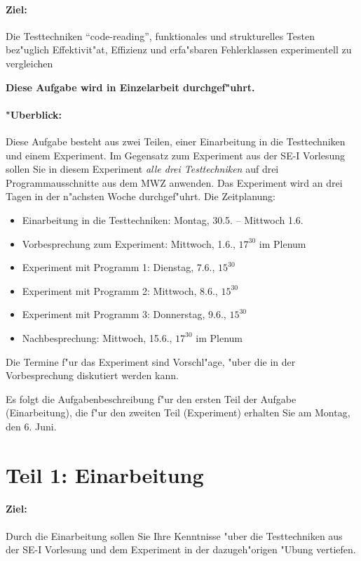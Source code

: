 \paragraph{Ziel:} Die Testtechniken "`code-reading"', 
funktionales und strukturelles Testen bez"uglich Effektivit"at, Effizienz
und erfa"sbaren Fehlerklassen experimentell zu vergleichen

\vspace*{5mm}
\centerline{\bf Diese Aufgabe wird in Einzelarbeit durchgef"uhrt.}

\paragraph{"Uberblick:} Diese Aufgabe besteht aus zwei Teilen, einer
	Einarbeitung in die Testtechniken und einem Experiment. Im 
	Gegensatz zum Experiment aus der SE-I Vorlesung sollen Sie 
	in diesem Experiment {\em alle drei Testtechniken\/}
	auf drei Programmausschnitte aus dem MWZ anwenden. Das Experiment 
	wird an drei Tagen in der n"achsten Woche durchgef"uhrt. Die Zeitplanung:
\begin{itemize}
	\item Einarbeitung in die Testtechniken: Montag, 30.5. -- Mittwoch 1.6.
	\item Vorbesprechung zum Experiment: Mittwoch, 1.6., $17^{30}$ im Plenum
	\item Experiment mit Programm 1: Dienstag, 7.6., $15^{30}$
	\item Experiment mit Programm 2: Mittwoch, 8.6., $15^{30}$
	\item Experiment mit Programm 3: Donnerstag, 9.6., $15^{30}$
	\item Nachbesprechung: Mittwoch, 15.6., $17^{30}$ im Plenum 
\end{itemize}
Die Termine f"ur das Experiment sind Vorschl"age, "uber die in der 
Vorbesprechung diskutiert werden kann.

Es folgt die Aufgabenbeschreibung f"ur den ersten Teil der Aufgabe 
(Einarbeitung), die f"ur den
zweiten Teil (Experiment) erhalten Sie am Montag, den 6. Juni.
\pagebreak

\section{Teil 1: Einarbeitung}

\paragraph{Ziel:} Durch die Einarbeitung sollen Sie Ihre Kenntnisse "uber 
die Testtechniken aus der SE-I Vorlesung und dem Experiment in der 
dazugeh"origen "Ubung vertiefen. 

